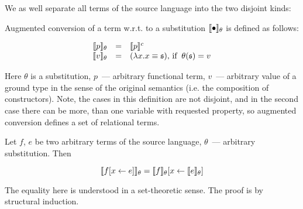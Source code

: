\begin{definition}
\normalfont
We as well separate all terms of the source language into the two disjoint kinds:


\end{definition}

\begin{definition}
\normalfont Augmented conversion of a term w.r.t. to a substitution $\llbracket{\bullet}\rrbracket_\theta$ is defined as follows: 

$$
\begin{array}{rcl}
\llbracket{p}\rrbracket_\theta&=&\llbracket{p}\rrbracket^c\\
\llbracket{v}\rrbracket_\theta&=&(\lambda x.x\equiv\mathfrak{s}),\,\mbox{if}\;\;\theta(\mathfrak s)=v
\end{array}
$$

Here $\theta$ is a substitution, $p$~--- arbitrary functional term, $v$~--- arbitrary value of a
ground type in the sense of the original semantics (i.e. the composition of constructors). Note, the
cases in this definition are not disjoint, and in the second case there can be more, than one
variable with requested property, so augmented conversion defines a set of relational terms.
\end{definition}

\begin{lemma}
\label{substitution}
\normalfont Let $f$, $e$ be two arbitrary terms of the source language, $\theta$~--- arbitrary
substitution. Then

$$
\llbracket{f[x\gets e]}\rrbracket_\theta=\llbracket{f}\rrbracket_\theta[x\gets\llbracket{e}\rrbracket_\theta]
$$

The equality here is understood in a set-theoretic sense. The proof is by structural 
induction.
\end{lemma}

